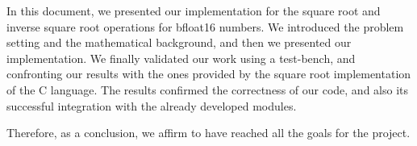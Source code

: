In this document, we presented our implementation for the square root and inverse square root operations for bfloat16 numbers. We introduced the problem setting and the mathematical background, and then we presented our implementation. We finally validated our work using a test-bench, and confronting our results with the ones provided by the square root implementation of the C language. The results confirmed the correctness of our code, and also its successful integration with the already developed modules. 

Therefore, as a conclusion, we affirm to have reached all the goals for the project.
\clearpage
